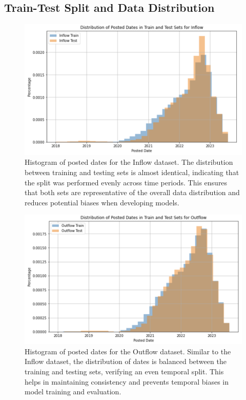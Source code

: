 \documentclass[12pt,letterpaper]{article}
\begin{document}
\subsection{Train-Test Split and Data Distribution}
\begin{figure}[H]
    \centering
    \includegraphics[width=\textwidth]{figure/inflow.png}
    \caption{Histogram of posted dates for the Inflow dataset. The distribution between training and testing sets is almost identical, indicating that the split was performed evenly across time periods. This ensures that both sets are representative of the overall data distribution and reduces potential biases when developing models.}
    \label{fig:inflow_date_distribution}
\end{figure}

\begin{figure}[H]
    \centering
    \includegraphics[width=\textwidth]{figure/outflow.png}
    \caption{Histogram of posted dates for the Outflow dataset. Similar to the Inflow dataset, the distribution of dates is balanced between the training and testing sets, verifying an even temporal split. This helps in maintaining consistency and prevents temporal biases in model training and evaluation.}
    \label{fig:outflow_date_distribution}
\end{figure}
\end{document}
